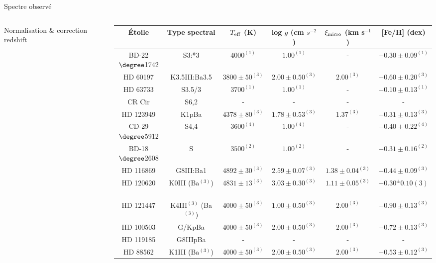\documentclass[10pt]{beamer}
\begin{document}
\begin{frame}[fragile]{Spectre observé}
\begin{columns}
\begin{column}{0.3\textwidth}
        Normalisation \& correction redshift
    \end{column}
    \begin{column}{0.7\textwidth}
        \begin{table}[h!]
                \begin{center}
                \begin{tabular}{cccccc}
                    \hline
                    \hline
                     Étoile & Type spectral & $T_{\rm eff}$ (K) & log $g$ (cm $s^{-2}$) & $\xi_{\rm micro}$ (km s$^{-1}$) & [Fe/H] (dex) \\
                    \hline
                    BD-22$\degree$1742 & S3:*3& $4000^{(1)}$ & $1.00^{(1)}$ & - & $-0.30\pm0.09^{(1)}$ \\
                    HD 60197 & K3.5III:Ba3.5 & $3800\pm50^{(3)}$ & $2.00\pm0.50^{(3)}$ & $2.00^{(3)}$ & $-0.60\pm0.20^{(3)}$\\
                    HD 63733 & 	S3.5/3 & $3700^{(1)}$ & $1.00^{(1)}$ & - & $-0.10\pm0.13^{(1)}$ \\
                    CR Cir & S6,2  & - & - & - & - \\
                    HD 123949 & K1pBa & $4378\pm80^{(3)}$ & $1.78\pm0.53^{(3)}$ & $1.37^{(3)}$ & $-0.31\pm0.13^{(3)}$ \\
                    CD-29$\degree$5912 & S4,4 & $3600^{(4)}$ & $1.00^{(4)}$ & - & $-0.40\pm0.22^{(4)}$ \\
                    BD-18$\degree$2608 & S & $3500^{(2)}$ & $1.00^{(2)}$ & - & $-0.31\pm0.16^{(2)}$ \\
                    HD 116869 & G8III:Ba1 & $4892\pm30^{(3)}$ & $2.59\pm0.07^{(3)}$ & $1.38\pm0.04^{(3)}$ & $-0.44\pm0.09^{(3)}$ \\
                    HD 120620 & K0III (Ba$^{(3)}$) & $4831\pm13^{(3)}$  & $3.03\pm0.30^{(3)}$ & $1.11\pm0.05^{(3)}$ & $-0.30^\pm0.10{(3)}$ \\
                    HD 121447 & K4III$^{(3)}$ (Ba$^{(3)}$) & $4000\pm50^{(3)}$ & $1.00\pm0.50^{(3)}$ & $2.00^{(3)}$ & $-0.90\pm0.13^{(3)}$\\
                    HD 100503 & G/KpBa & $4000\pm50^{(3)}$ & $2.00\pm0.50^{(3)}$ & $2.00^{(3)}$ & $-0.72\pm0.13^{(3)}$ \\
                    HD 119185 &  G8IIIpBa & - & - & - & - \\
                    HD 88562  & K1III (Ba$^{(3)}$)& $4000\pm50^{(3)}$ & $2.00\pm0.50^{(3)}$ & $2.00^{(3)}$ & $-0.53\pm0.12^{(3)}$\\

\end{tabular}
\end{center}
\end{table}
\end{column}
\end{columns}
\end{frame}
\end{document}
